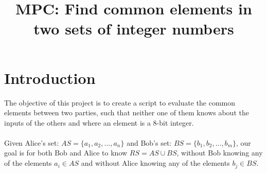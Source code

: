 \documentclass[12pt, letterpaper]{article}
\title{MPC: Find common elements in two sets of integer numbers}
\begin{document}
\maketitle

\tableofcontents
\pagebreak

\section{Introduction}
The objective of this project is to create a script to evaluate the common elements between two parties, such that neither one of them knows about the inputs of the others and where an element is a 8-bit integer.\\
\\
Given Alice's set: $AS = \{a_1, a_2, \dots, a_n\}$ and Bob's set: $BS = \{b_1, b_2, \dots, b_m\}$, our goal is for both Bob and Alice to know $RS = AS \cup BS$, without Bob knowing any of the elements $a_i \in AS$ and without Alice knowing any of the elements $b_j \in BS$.
\end{document}
